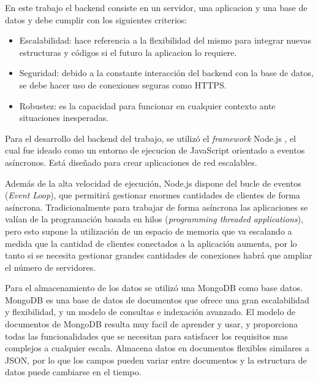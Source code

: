 En este trabajo el backend consiste en un servidor, una aplicacion y una base de datos y debe cumplir con los siguientes criterios:

\begin{itemize}
	\item Escalabilidad: hace referencia a la flexibilidad del mismo para integrar nuevas estructuras y códigos si el futuro la aplicacion lo requiere.
	
	\item Seguridad: debido a la constante interacción del backend con la base de datos, se debe hacer uso de conexiones seguras como HTTPS.
	
	\item Robustez: es la capacidad para funcionar en cualquier contexto ante situaciones inesperadas.
	
\end{itemize}

Para el desarrollo del backend del trabajo, se utilizó el \textit{framework} Node.js \citep{WEBSITE:19} ,  el cual fue ideado como un entorno de ejecucion de JavaScript orientado a eventos asíncronos. Está diseñado para crear aplicaciones de red escalables.

Además de la alta velocidad de ejecución, Node.js dispone del bucle de eventos (\textit{Event Loop}), que permitirá gestionar enormes cantidades de clientes de forma asíncrona. Tradicionalmente para trabajar de forma asíncrona las aplicaciones se valían de la programación basada en hilos (\textit{programming threaded applications}), pero esto supone la utilización de un espacio de memoria que va escalando a medida que la cantidad de clientes conectados a la aplicación aumenta, por lo tanto si se necesita gestionar grandes cantidades de conexiones habrá que ampliar el número de servidores.

Para el almacenamiento de los datos se utilizó una MongoDB \citep{WEBSITE:20} como base datos.  MongoDB es una base de datos de documentos que ofrece una gran escalabilidad y flexibilidad,  y un modelo de consultas e indexación avanzado. El modelo de documentos de MongoDB resulta muy facil de aprender y usar, y proporciona todas las funcionalidades que se necesitan para satisfacer los requisitos mas complejos a cualquier escala. Almacena datos en documentos flexibles similares a JSON, por lo que los campos pueden variar entre documentos y la estructura de datos puede cambiarse en el tiempo.




